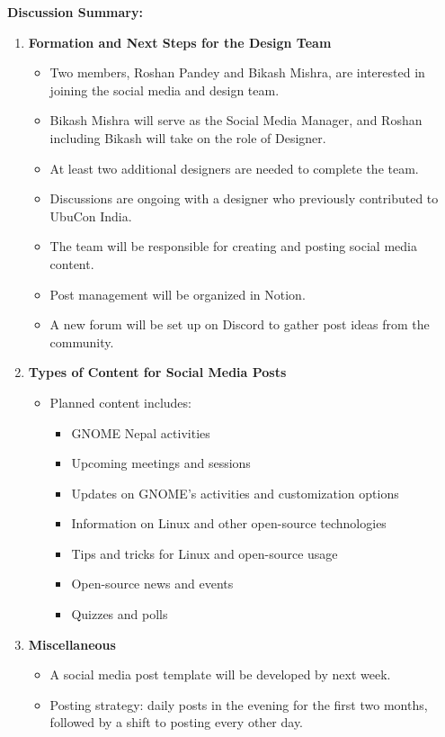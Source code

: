 \documentclass[a4paper,12pt]{article}
\begin{document}
\noindent\textbf{Discussion Summary:}
\begin{enumerate}[label=\arabic*.]
    \item \textbf{Formation and Next Steps for the Design Team}
    \begin{itemize}
        \item Two members, Roshan Pandey and Bikash Mishra, are interested in joining the social media and design team.
        \item Bikash Mishra will serve as the Social Media Manager, and Roshan including Bikash will take on the role of Designer.
        \item At least two additional designers are needed to complete the team.
        \item Discussions are ongoing with a designer who previously contributed to UbuCon India.
        \item The team will be responsible for creating and posting social media content.
        \item Post management will be organized in Notion.
        \item A new forum will be set up on Discord to gather post ideas from the community.
    \end{itemize}

    \item \textbf{Types of Content for Social Media Posts}
    \begin{itemize}
        \item Planned content includes:
        \begin{itemize}
            \item GNOME Nepal activities
            \item Upcoming meetings and sessions
            \item Updates on GNOME’s activities and customization options
            \item Information on Linux and other open-source technologies
            \item Tips and tricks for Linux and open-source usage
            \item Open-source news and events
            \item Quizzes and polls
        \end{itemize}
    \end{itemize}

    \item \textbf{Miscellaneous}
    \begin{itemize}
        \item A social media post template will be developed by next week.
        \item Posting strategy: daily posts in the evening for the first two months, followed by a shift to posting every other day.
    \end{itemize}
\end{enumerate}
\end{document}
